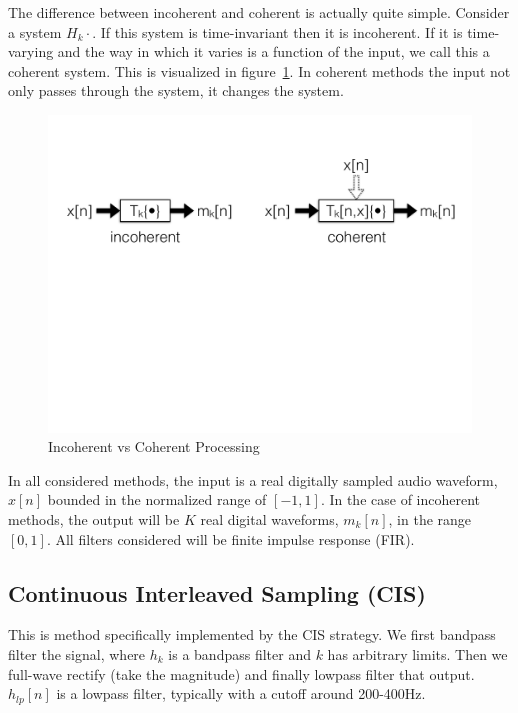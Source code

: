 \documentclass [11pt, proquest,oneside] {uwthesis}[2015/03/03]
\begin{document}
The difference between incoherent and coherent is actually quite simple.  Consider a system $H_k{\cdot}$.  If this system is time-invariant then it is incoherent.  If it is time-varying and the way in which it varies is a function of the input, we call this a coherent system.  This is visualized in figure~\ref{fig:incoherent_vs_coherent}.  In coherent methods the input not only passes through the system, it changes the system.

\begin{figure}[!ht]
  \centering
    \includegraphics[width=1\textwidth]{incoherent_vs_coherent}   
    \caption{Incoherent vs Coherent Processing}\label{fig:incoherent_vs_coherent}
\end{figure}

In all considered methods, the input is a real digitally sampled audio waveform, $x[n]$ bounded in the normalized range of $[-1, 1]$.  In the case of incoherent methods, the output will be $K$ real digital waveforms, $m_k[n]$, in the range $[0, 1]$.  All filters considered will be finite impulse response (FIR).

\subsection{Continuous Interleaved Sampling (CIS)}

This is method specifically implemented by the CIS strategy.  We first bandpass filter the signal, where $h_k$ is a bandpass filter and $k$ has arbitrary limits.  Then we full-wave rectify (take the magnitude) and finally lowpass filter that output.  $h_{lp}[n]$ is a lowpass filter, typically with a cutoff around 200-400Hz.
\end{document}
